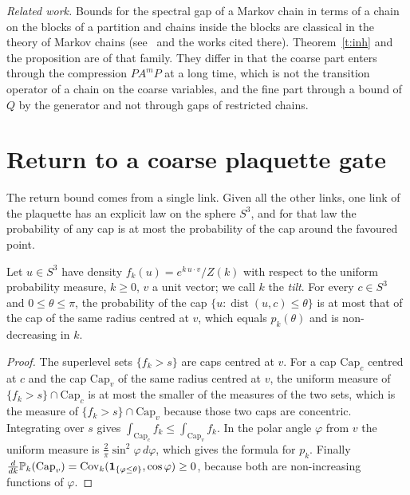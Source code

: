 \emph{Related work.} Bounds for the spectral gap of a Markov chain in terms of a chain on the blocks of a
partition and chains inside the blocks are classical in the theory of Markov chains (see~\cite{JSTV04} and
the works cited there). Theorem~\ref{t:inh} and the proposition are of that family. They differ in that the
coarse part enters through the compression $PA^mP$ at a long time, which is not the transition operator of a
chain on the coarse variables, and the fine part through a bound of $Q$ by the generator and not through
gaps of restricted chains.

\section{Return to a coarse plaquette gate}\label{s:ret}
The return bound comes from a single link. Given all the other links, one link of the plaquette has an
explicit law on the sphere $S^3$, and for that law the probability of any cap is at most the probability of
the cap around the favoured point.

\begin{lemma}\label{l:cap}
Let $u\in S^3$ have density $f_k(u)=e^{k\,u\cdot v}/Z(k)$ with respect to the uniform probability measure,
$k\ge0$, $v$ a unit vector; we call $k$ the \emph{tilt}. For every $c\in S^3$ and $0\le\theta\le\pi$, the probability of the cap
$\{u:\operatorname{dist}(u,c)\le\theta\}$ is at most that of the cap of the same radius centred at $v$, which
equals $p_k(\theta)$ and is non-decreasing in $k$.
\end{lemma}
\begin{proof}
The superlevel sets $\{f_k>s\}$ are caps centred at $v$. For a cap $\mathrm{Cap}_c$ centred at $c$ and the cap $\mathrm{Cap}_v$ of the
same radius centred at $v$, the uniform measure of $\{f_k>s\}\cap\mathrm{Cap}_c$ is at most the smaller of the measures of
the two sets, which is the measure of $\{f_k>s\}\cap\mathrm{Cap}_v$ because those two caps are concentric. Integrating
over $s$ gives $\int_{\mathrm{Cap}_c}f_k\le\int_{\mathrm{Cap}_v}f_k$. In the polar angle $\varphi$ from $v$ the uniform measure is
$\tfrac2\pi\sin^2\varphi\,d\varphi$, which gives the formula for $p_k$. Finally $\frac{d}{dk}\mathbb{P}_k(\mathrm{Cap}_v)=
\operatorname{Cov}_k(\mathbf 1_{\{\varphi\le\theta\}},\cos\varphi)\ge0$, because both are non-increasing functions of $\varphi$.
\end{proof}

